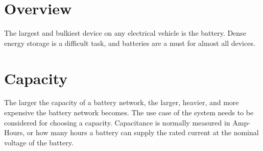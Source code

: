 \documentclass{article}
\begin{document}
\section{Overview}
The largest and bulkiest device on any electrical vehicle is the battery.
Dense energy storage is a difficult task, and batteries are a must for almost all devices.
\section{Capacity}
The larger the capacity of a battery network, the larger, heavier, and more expensive the battery network becomes.
The use case of the system needs to be considered for choosing a capacity.
Capacitance is normally measured in Amp-Hours, or how many hours a battery can supply the rated current at the nominal voltage of the battery.
\end{document}
